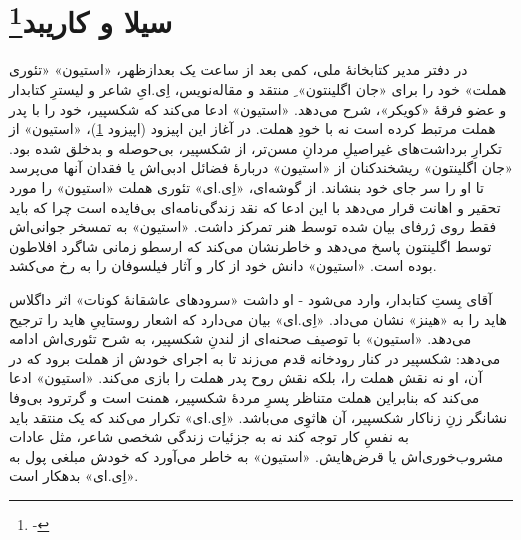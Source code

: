 \documentclass[12pt]{book}
\newcommand{\noun}[1]{«{#1}»}
\begin{document}
    \chapter[سیلا و کاریبد]{سیلا و کاریبد\protect\footnote{-}}\label{ep:9}
    در دفتر مدیر کتابخانۀ ملی، کمی بعد از ساعت یک بعدازظهر، \noun{استیون} «تئوری هملت» خود را برای \noun{جان اگلینتون} ِ منتقد و مقاله‌نویس، اِی.ایِ شاعر و لیسترِ کتابدار و عضو فرقۀ \noun{کویکر}، شرح می‌دهد. \noun{استیون} ادعا می‌کند که شکسپیر، خود را با پدر هملت مرتبط کرده است نه با خودِ هملت. در آغاز این اپیزود (اپیزود \ref{ep:9})، \noun{استیون} از تکرارِ برداشت‌های غیراصیلِ مردانِ مسن‌تر، از شکسپیر، بی‌حوصله و بدخلق شده بود. \noun{جان اگلینتون}  ریشخندکنان از \noun{استیون} دربارۀ فضائل ادبی‌اش یا فقدان آنها می‌پرسد تا او را سر جای خود بنشاند. از گوشه‌ای، \noun{اِی.ای} تئوری هملت \noun{استیون} را مورد تحقیر و اهانت قرار می‌دهد با این ادعا که نقد زندگی‌نامه‌ای بی‌فایده است چرا که باید فقط روی ژرفای بیان شده توسط هنر تمرکز داشت. \noun{استیون} به تمسخر جوانی‌اش توسط اگلینتون پاسخ می‌دهد و خاطرنشان می‌کند که ارسطو زمانی شاگرد افلاطون بوده است. \noun{استیون} دانش خود از کار و آثار فیلسوفان را به رخ می‌کشد.

    آقای بِستِ کتابدار، وارد می‌شود - او داشت «سرودهای عاشقانۀ کونات» اثر داگلاس هاید را به \noun{هینز}  نشان می‌داد. \noun{اِی.ای} بیان می‌دارد که اشعار روستاییِ هاید را ترجیح می‌دهد. \noun{استیون} با توصیف صحنه‌ای از لندنِ شکسپیر، به شرح تئوری‌اش ادامه می‌دهد: شکسپیر در کنار رودخانه قدم می‌زند تا به اجرای خودش از هملت برود که در آن، او نه نقش هملت را، بلکه نقش روح پدر هملت را بازی می‌کند. \noun{استیون} ادعا می‌کند که بنابراین هملت متناظر پسرِ مردۀ شکسپیر، همنت است و گرترود بی‌وفا نشانگر زنِ زناکار شکسپیر، آن هاثوِی می‌باشد. \noun{اِی.ای} تکرار می‌کند که یک منتقد باید به نفسِ کار توجه کند نه به جزئیات زندگی شخصی شاعر، مثل عادات مشروب‌خوری‌اش یا قرض‌هایش. \noun{استیون} به خاطر می‌آورد که خودش مبلغی پول به \noun{اِی.ای} بدهکار است.
\end{document}
